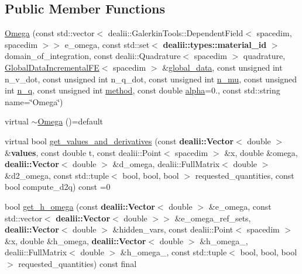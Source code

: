 \subsection*{Public Member Functions}
\begin{DoxyCompactItemize}
\item 
\hyperlink{classincremental_f_e_1_1_omega_3_01spacedim_00_01spacedim_01_4_aa83ba9eb9e17b3b7ed6c573c172c4375}{Omega} (const std\+::vector$<$ dealii\+::\+Galerkin\+Tools\+::\+Dependent\+Field$<$ spacedim, spacedim $>$$>$ e\+\_\+omega, const std\+::set$<$ {\bf dealii\+::types\+::material\+\_\+id} $>$ domain\+\_\+of\+\_\+integration, const dealii\+::\+Quadrature$<$ spacedim $>$ quadrature, \hyperlink{classincremental_f_e_1_1_global_data_incremental_f_e}{Global\+Data\+Incremental\+FE}$<$ spacedim $>$ \&\hyperlink{classincremental_f_e_1_1_omega_3_01spacedim_00_01spacedim_01_4_afffe781a5a2032ec003032adc78e1bf3}{global\+\_\+data}, const unsigned int n\+\_\+v\+\_\+dot, const unsigned int n\+\_\+q\+\_\+dot, const unsigned int \hyperlink{classincremental_f_e_1_1_omega_3_01spacedim_00_01spacedim_01_4_a7f1db416dd6b487504856959c7253b53}{n\+\_\+mu}, const unsigned int \hyperlink{classincremental_f_e_1_1_omega_3_01spacedim_00_01spacedim_01_4_a708fdb9951f4879eaa020219f19db115}{n\+\_\+q}, const unsigned int \hyperlink{classincremental_f_e_1_1_omega_3_01spacedim_00_01spacedim_01_4_a6c95d57122261e8a2e26d3818251bc9b}{method}, const double \hyperlink{classincremental_f_e_1_1_omega_3_01spacedim_00_01spacedim_01_4_ad881c36804cc027c301f4f069756c2db}{alpha}=0., const std\+::string name=\char`\"{}Omega\char`\"{})
\item 
virtual \hyperlink{classincremental_f_e_1_1_omega_3_01spacedim_00_01spacedim_01_4_a9299cef8c66dd19302381f1c7b4d5c4c}{$\sim$\+Omega} ()=default
\item 
virtual bool \hyperlink{classincremental_f_e_1_1_omega_3_01spacedim_00_01spacedim_01_4_a40131354ef0a28ca48a0e6c9ed33aa33}{get\+\_\+values\+\_\+and\+\_\+derivatives} (const {\bf dealii\+::\+Vector}$<$ double $>$ \&{\bf values}, const double t, const dealii\+::\+Point$<$ spacedim $>$ \&x, double \&omega, {\bf dealii\+::\+Vector}$<$ double $>$ \&d\+\_\+omega, dealii\+::\+Full\+Matrix$<$ double $>$ \&d2\+\_\+omega, const std\+::tuple$<$ bool, bool, bool $>$ requested\+\_\+quantities, const bool compute\+\_\+d2q) const =0
\item 
bool \hyperlink{classincremental_f_e_1_1_omega_3_01spacedim_00_01spacedim_01_4_a183af2dde75d7b92afa02fdbf0216d85}{get\+\_\+h\+\_\+omega} (const {\bf dealii\+::\+Vector}$<$ double $>$ \&e\+\_\+omega, const std\+::vector$<$ {\bf dealii\+::\+Vector}$<$ double $>$$>$ \&e\+\_\+omega\+\_\+ref\+\_\+sets, {\bf dealii\+::\+Vector}$<$ double $>$ \&hidden\+\_\+vars, const dealii\+::\+Point$<$ spacedim $>$ \&x, double \&h\+\_\+omega, {\bf dealii\+::\+Vector}$<$ double $>$ \&h\+\_\+omega\+\_, dealii\+::\+Full\+Matrix$<$ double $>$ \&h\+\_\+omega\+\_, const std\+::tuple$<$ bool, bool, bool $>$ requested\+\_\+quantities) const final
\end{DoxyCompactItemize}
